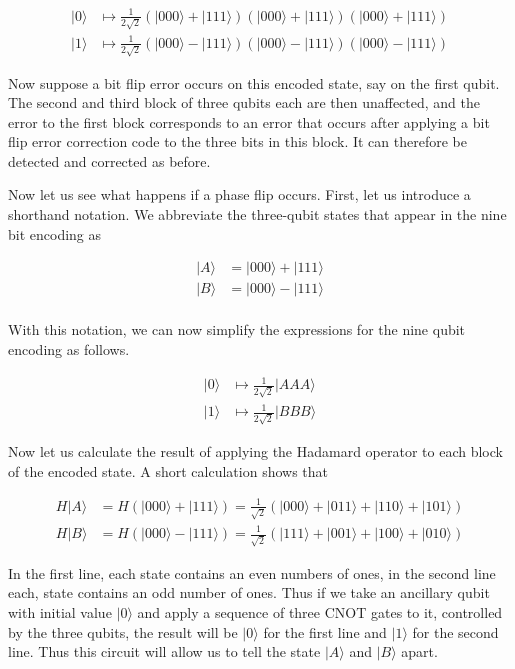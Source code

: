 \documentclass[a4paper, draft]{article}
\theoremstyle{own}
\theoremstyle{remark}
\begin{document}
\begin{align*}
|0 \rangle &\mapsto \frac{1}{2\sqrt{2}} (|000 \rangle + |111 \rangle) (|000 \rangle + |111 \rangle) (|000 \rangle + |111 \rangle) \\
|1 \rangle &\mapsto \frac{1}{2\sqrt{2}} (|000 \rangle - |111 \rangle) (|000 \rangle - |111 \rangle) (|000 \rangle - |111 \rangle)
\end{align*}

Now suppose a bit flip error occurs on this encoded state, say on the first qubit. The second and third block of three qubits each are then unaffected, and the error to the first block corresponds to an error that occurs after applying a bit flip error correction code to the three bits in this block. It can therefore be detected and corrected as before.

Now let us see what happens if a phase flip occurs. First, let us introduce a shorthand notation. We abbreviate the three-qubit states that appear in the nine bit encoding as

\begin{align*}
|A \rangle &= |000 \rangle + |111 \rangle \\
|B \rangle &= |000 \rangle - |111 \rangle \\
\end{align*}

With this notation, we can now simplify the expressions for the nine qubit encoding as follows.

\begin{align*}
|0 \rangle &\mapsto \frac{1}{2\sqrt{2}} |AAA \rangle \\
|1 \rangle &\mapsto \frac{1}{2\sqrt{2}} |BBB \rangle
\end{align*}


Now let us calculate the result of applying the Hadamard operator to each block of the encoded state. A short calculation shows that

\begin{align*}
H|A \rangle & = H(|000 \rangle + |111 \rangle) = \frac{1}{\sqrt{2}} (|000 \rangle + |011 \rangle + |110 \rangle + |101 \rangle) \\
H |B \rangle &= H(|000 \rangle - |111 \rangle) = \frac{1}{\sqrt{2}} (|111 \rangle + |001 \rangle + |100 \rangle + |010 \rangle) 
\end{align*}

In the first line, each state contains an even numbers of ones, in the second line each, state contains an odd number of ones. Thus if we take an ancillary qubit with initial value $|0 \rangle$ and apply a sequence of three CNOT gates to it, controlled by the three qubits, the result will be $|0 \rangle$ for the first line and $|1 \rangle$ for the second line. Thus this circuit will allow us to tell the state $|A \rangle $ and $|B \rangle $ apart.
\end{document}
